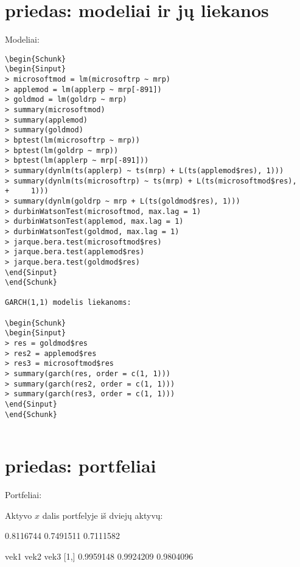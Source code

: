 \documentclass[12pt, a14paper, lithuanian]{article}
\begin{document}
\section{priedas: modeliai ir jų liekanos}
\label{B 1}
Modeliai:

\begin{verbatim}
\begin{Schunk}
\begin{Sinput}
> microsoftmod = lm(microsoftrp ~ mrp)
> applemod = lm(applerp ~ mrp[-891])
> goldmod = lm(goldrp ~ mrp)
> summary(microsoftmod)
> summary(applemod)
> summary(goldmod)
> bptest(lm(microsoftrp ~ mrp))
> bptest(lm(goldrp ~ mrp))
> bptest(lm(applerp ~ mrp[-891]))
> summary(dynlm(ts(applerp) ~ ts(mrp) + L(ts(applemod$res), 1)))
> summary(dynlm(ts(microsoftrp) ~ ts(mrp) + L(ts(microsoftmod$res), 
+     1)))
> summary(dynlm(goldrp ~ mrp + L(ts(goldmod$res), 1)))
> durbinWatsonTest(microsoftmod, max.lag = 1)
> durbinWatsonTest(applemod, max.lag = 1)
> durbinWatsonTest(goldmod, max.lag = 1)
> jarque.bera.test(microsoftmod$res)
> jarque.bera.test(applemod$res)
> jarque.bera.test(goldmod$res)
\end{Sinput}
\end{Schunk}

GARCH(1,1) modelis liekanoms:

\begin{Schunk}
\begin{Sinput}
> res = goldmod$res
> res2 = applemod$res
> res3 = microsoftmod$res
> summary(garch(res, order = c(1, 1)))
> summary(garch(res2, order = c(1, 1)))
> summary(garch(res3, order = c(1, 1)))
\end{Sinput}
\end{Schunk}


\end{verbatim}

\section{priedas: portfeliai}
Portfeliai:


\label{C1}
 Aktyvo $x$ dalis portfelyje iš dviejų aktyvų:

\begin{Schunk}
\begin{Soutput}
          [,1]      [,2]      [,3]
[1,] 0.8116744 0.7491511 0.7111582
\end{Soutput}
\end{Schunk}

\begin{Schunk}
\begin{Soutput}
          vek1      vek2      vek3
[1,] 0.9959148 0.9924209 0.9804096
\end{Soutput}
\end{Schunk}
\end{document}
